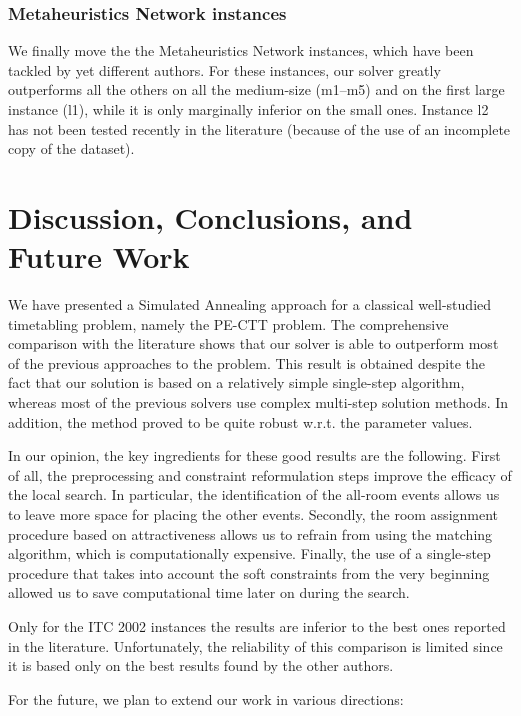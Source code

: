\documentclass[authoryear,preprint,a4paper,12pt]{elsarticle}
\begin{document}
\subsubsection{Metaheuristics Network instances}

We finally move the the Metaheuristics Network instances, which have
been tackled by yet different authors. For these instances, our solver
greatly outperforms all the others on all the medium-size (m1--m5) and
on the first large instance (l1), while it is only marginally inferior
on the small ones. Instance l2 has not been tested recently in the
literature (because of the use of an incomplete copy of the dataset).


\section{Discussion, Conclusions, and Future Work}

We have presented a Simulated Annealing approach for a classical
well-studied timetabling problem, namely the PE-CTT problem.  The
comprehensive comparison with the literature shows that our solver is
able to outperform most of the previous approaches to the problem.
This result is obtained despite the fact that our solution is based on
a relatively simple single-step algorithm, whereas
most of the previous solvers use complex multi-step solution methods.  
In addition, the method proved to be quite robust w.r.t. the parameter values.

In our opinion, the key ingredients for these good results are the following.
First of all, the preprocessing and constraint reformulation steps
improve the efficacy of the local search. In particular, the
identification of the all-room events allows us to leave more space for
placing the other events.  Secondly, the room assignment procedure
based on attractiveness allows us to refrain from using the matching
algorithm, which is computationally expensive. Finally, the use of a
single-step procedure that takes into account the soft constraints from the
very beginning allowed us to save computational time later on during the search.

Only for the ITC 2002 instances the results are inferior to the best
ones reported in the literature. Unfortunately, the reliability of this
comparison is limited since it is based only on the best results found
by the other authors. 

For the future, we plan to extend our work in various directions:
\end{document}
